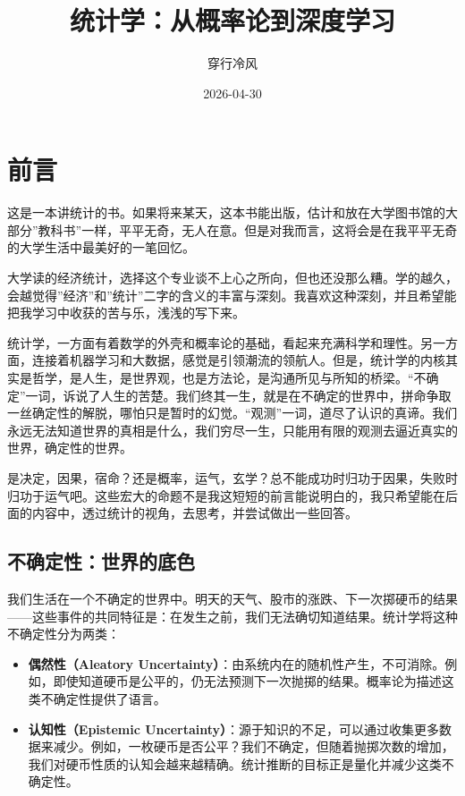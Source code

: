 \documentclass[
]{book}
\title{统计学：从概率论到深度学习}
\author{穿行冷风}
\date{2026-04-30}
\providecommand{\tightlist}{%
  \setlength{\itemsep}{0pt}\setlength{\parskip}{0pt}}
\begin{document}
\maketitle

{
\setcounter{tocdepth}{1}
\tableofcontents
}
\chapter*{前言}\label{ux524dux8a00}

这是一本讲统计的书。如果将来某天，这本书能出版，估计和放在大学图书馆的大部分''教科书''一样，平平无奇，无人在意。但是对我而言，这将会是在我平平无奇的大学生活中最美好的一笔回忆。

大学读的经济统计，选择这个专业谈不上心之所向，但也还没那么糟。学的越久，会越觉得''经济''和''统计''二字的含义的丰富与深刻。我喜欢这种深刻，并且希望能把我学习中收获的苦与乐，浅浅的写下来。

统计学，一方面有着数学的外壳和概率论的基础，看起来充满科学和理性。另一方面，连接着机器学习和大数据，感觉是引领潮流的领航人。但是，统计学的内核其实是哲学，是人生，是世界观，也是方法论，是沟通所见与所知的桥梁。``不确定''一词，诉说了人生的苦楚。我们终其一生，就是在不确定的世界中，拼命争取一丝确定性的解脱，哪怕只是暂时的幻觉。``观测''一词，道尽了认识的真谛。我们永远无法知道世界的真相是什么，我们穷尽一生，只能用有限的观测去逼近真实的世界，确定性的世界。

是决定，因果，宿命？还是概率，运气，玄学？总不能成功时归功于因果，失败时归功于运气吧。这些宏大的命题不是我这短短的前言能说明白的，我只希望能在后面的内容中，透过统计的视角，去思考，并尝试做出一些回答。

\section{不确定性：世界的底色}\label{ux4e0dux786eux5b9aux6027ux4e16ux754cux7684ux5e95ux8272}

我们生活在一个不确定的世界中。明天的天气、股市的涨跌、下一次掷硬币的结果------这些事件的共同特征是：在发生之前，我们无法确切知道结果。统计学将这种不确定性分为两类：

\begin{itemize}
\tightlist
\item
  \textbf{偶然性（Aleatory Uncertainty）}：由系统内在的随机性产生，不可消除。例如，即使知道硬币是公平的，仍无法预测下一次抛掷的结果。概率论为描述这类不确定性提供了语言。
\item
  \textbf{认知性（Epistemic Uncertainty）}：源于知识的不足，可以通过收集更多数据来减少。例如，一枚硬币是否公平？我们不确定，但随着抛掷次数的增加，我们对硬币性质的认知会越来越精确。统计推断的目标正是量化并减少这类不确定性。
\end{itemize}
\end{document}

